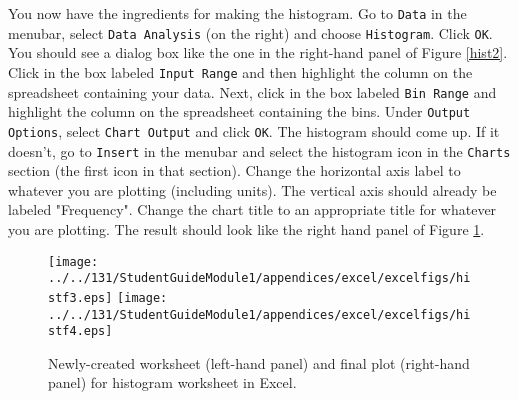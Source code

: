 You now have the ingredients for making the histogram.
Go to {\tt Data} in the menubar, select {\tt Data Analysis} (on the right) and 
choose {\tt Histogram}. Click {\tt OK}.
You should see a dialog box like the one in the right-hand panel of  Figure \ref{hist2}.
Click in the box labeled {\tt Input Range} and then highlight the column on the spreadsheet containing your data.
Next, click in the box labeled {\tt Bin Range} and highlight the column on the spreadsheet containing the bins.
Under {\tt Output Options}, select {\tt Chart Output} and click {\tt OK}. The histogram should come up. 
If it doesn't, go to {\tt Insert} in the menubar and select 
the histogram icon in the {\tt Charts} section (the first icon in that section).
Change the horizontal axis label to whatever you are plotting (including units). The vertical axis should already be labeled "Frequency".
Change the chart title to an appropriate title for whatever you are plotting. 
The result should look like the right hand panel of Figure \ref{hist5}.
\begin{figure}[b!]
\begin{center}
\texttt{[image: ../../131/StudentGuideModule1/appendices/excel/excelfigs/histf3.eps]}
\hspace{0.4in}
\texttt{[image: ../../131/StudentGuideModule1/appendices/excel/excelfigs/histf4.eps]}
\caption{Newly-created worksheet (left-hand panel) and final plot (right-hand panel) for  histogram worksheet in Excel.}\label{hist5}
\end{center}
\end{figure}

